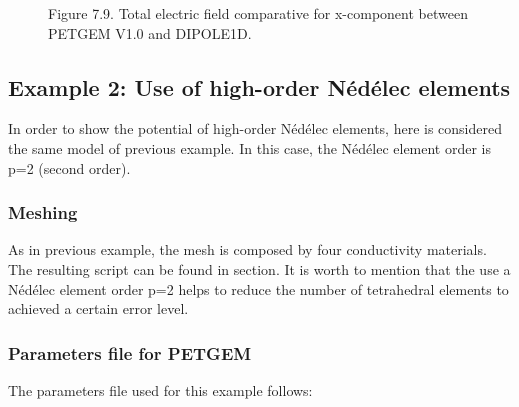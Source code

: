 \documentclass[letterpaper,10pt,english]{sphinxmanual}
\begin{document}
\begin{figure}[htbp]
\centering
\capstart

\noindent{}
\caption{Figure 7.9. Total electric field comparative for x-component between PETGEM V1.0 and DIPOLE1D.}\label{\detokenize{Manual:id22}}\label{\detokenize{Manual:figure-7-9}}\end{figure}


\subsection{Example 2: Use of high-order Nédélec elements}
\label{\detokenize{Manual:example-2-use-of-high-order-nedelec-elements}}
In order to show the potential of high-order Nédélec elements, here is
considered the same model of previous example. In this case, the
Nédélec element order is p=2 (second order).


\subsubsection{Meshing}
\label{\detokenize{Manual:id8}}
As in previous example, the mesh is composed by four conductivity materials. The
resulting  script can be found in {\hyperref[\detokenize{Download:download}]{}}
section. It is worth to mention that the use a Nédélec element order p=2 helps
to reduce the number of tetrahedral elements to achieved a certain error level.


\subsubsection{Parameters file for PETGEM}
\label{\detokenize{Manual:id9}}
The parameters file used for this example follows:
\end{document}
